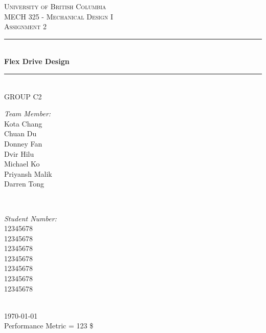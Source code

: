 \documentclass[letterpaper,12pt]{article}
\begin{document}
	
\begin{titlepage}
	
	\newcommand{\HRule}{\rule{\linewidth}{0.5mm}}
	
	\center
	
	\textsc{\LARGE University of British Columbia}\\[1.5cm]
	\textsc{\Large MECH 325 - Mechanical Design I}\\[0.5cm]
	\textsc{\Large Assignment 2}\\[0.5cm]
	
	\HRule \\[0.8cm]
	{ \huge \bfseries Flex Drive Design}\\[0.4cm]
	\HRule \\[1cm]
	
	{\Large GROUP C2}\\
	\vspace{0.5cm}
	
	\begin{minipage}{0.4\textwidth}
		\begin{flushleft} \large
			\emph{Team Member:}\\
			Kota Chang\\
			Chuan Du\\
			Donney Fan\\
			Dvir Hilu\\
			Michael Ko\\
			Priyansh Malik\\
			Darren Tong\\
		\end{flushleft}
	\end{minipage}
	~
	\begin{minipage}{0.4\textwidth}
		\begin{flushright} \large
			\emph{Student Number:} \\
			12345678\\
			12345678\\
			12345678\\
			12345678\\
			12345678\\
			12345678\\
			12345678
			
		\end{flushright}
	\end{minipage}\\[2cm]
	
	{\large \today}\\[2cm]
	
	{\large
		Performance Metric = 123 \$
	}
	
	
	\vfill %
	
\end{titlepage}
\end{document}
